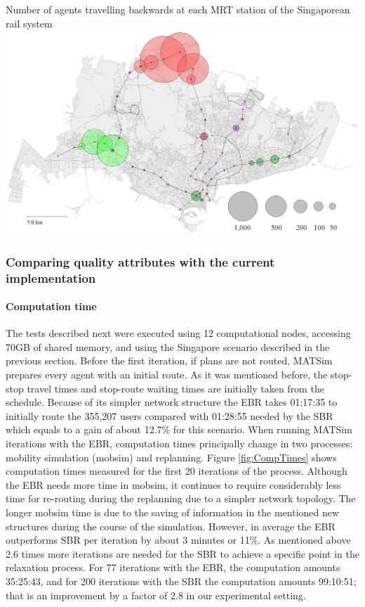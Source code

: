 \createfigure
{}
{Number of agents travelling backwards at each MRT station of the Singaporean rail system}
{\label{fig:Backwards}}
{\includegraphics[width=1.0\textwidth]{extending/figures/ebr/Backwards.png}}
{}

\subsubsection{Comparing quality attributes with the current implementation}

\paragraph{Computation time}

The tests described next were executed using 12 computational nodes, accessing 70GB of shared memory, and using the Singapore scenario described in the previous section. Before the first iteration, if plans are not routed, MATSim prepares every agent with an initial route. As it was mentioned before, the stop-stop travel times and stop-route waiting times are initially taken from the schedule. Because of its simpler network structure the EBR takes 01:17:35 to initially route the 355,207 users compared with 01:28:55 needed by the SBR which equals to a gain of about 12.7\% for this scenario. When running MATSim iterations with the EBR, computation times principally change in two processes: mobility simulation (mobsim) and replanning. Figure \ref{fig:CompTimes} shows computation times measured for the first 20 iterations of the process. Although the EBR needs more time in mobsim, it continues to require considerably less time for re-routing during the replanning due to a simpler network topology. The longer mobsim time is due to the saving of information in the mentioned new structures during the course of the simulation. However, in average the EBR outperforms SBR per iteration by about 3 minutes or 11\%. As mentioned above 2.6 times more iterations are needed for the SBR to achieve a specific point in the relaxation process. For 77 iterations with the EBR, the computation amounts 35:25:43, and for 200 iterations with the SBR the computation amounts 99:10:51; that is an improvement by a factor of 2.8 in our experimental setting.

